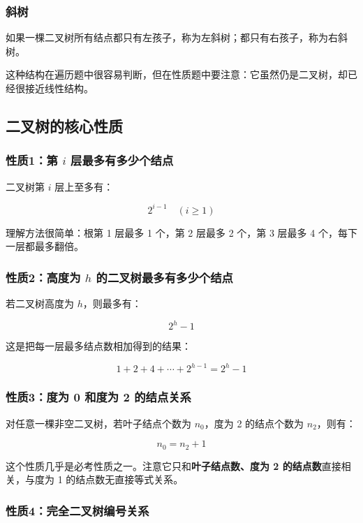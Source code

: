 \documentclass{../../note}
\begin{document}
\subsubsection{斜树}

如果一棵二叉树所有结点都只有左孩子，称为左斜树；都只有右孩子，称为右斜树。

这种结构在遍历题中很容易判断，但在性质题中要注意：它虽然仍是二叉树，却已经很接近线性结构。

\subsection{二叉树的核心性质}

\subsubsection{性质1：第 $i$ 层最多有多少个结点}

二叉树第 $i$ 层上至多有：

\[
2^{i-1} \quad (i \geq 1)
\]

理解方法很简单：根第 1 层最多 1 个，第 2 层最多 2 个，第 3 层最多 4 个，每下一层都最多翻倍。

\subsubsection{性质2：高度为 $h$ 的二叉树最多有多少个结点}

若二叉树高度为 $h$，则最多有：

\[
2^h - 1
\]

这是把每一层最多结点数相加得到的结果：

\[
1 + 2 + 4 + \cdots + 2^{h-1} = 2^h - 1
\]

\subsubsection{性质3：度为 0 和度为 2 的结点关系}

对任意一棵非空二叉树，若叶子结点个数为 $n_0$，度为 2 的结点个数为 $n_2$，则有：

\[
n_0 = n_2 + 1
\]

这个性质几乎是必考性质之一。注意它只和\textbf{叶子结点数、度为 2 的结点数}直接相关，与度为 1 的结点数无直接等式关系。

\subsubsection{性质4：完全二叉树编号关系}
\end{document}
